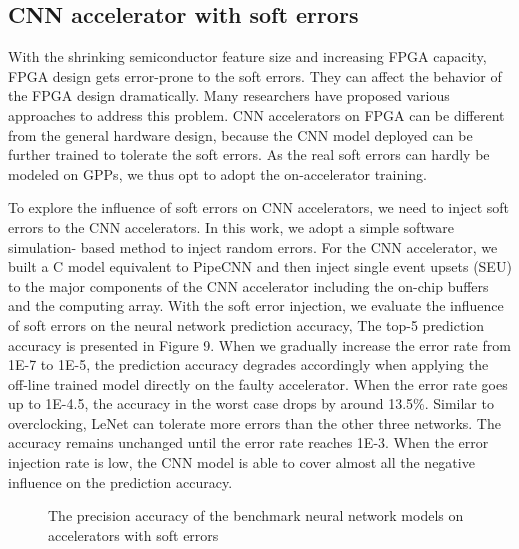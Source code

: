 \subsection{CNN accelerator with soft errors}
With the shrinking semiconductor feature size and increasing FPGA capacity, 
FPGA design gets error-prone to the soft errors. 
They can affect the behavior of the FPGA design dramatically. 
Many researchers \cite{Mansour_20,Karim_21,Nidhin_22,Subasi_23,ROSCH_24} 
have proposed various approaches to address this problem. CNN accelerators 
on FPGA can be different from the general hardware design, because 
the CNN model deployed can be further trained to tolerate the 
soft errors. As the real soft errors can hardly be modeled on GPPs, we thus
opt to adopt the on-accelerator training.

To explore the influence of soft errors on CNN accelerators, we need to inject soft errors to the CNN accelerators. 
In this work, we adopt a simple software simulation- based method to inject random errors. 
For the CNN accelerator, we built a C model equivalent to PipeCNN and then inject single event 
upsets (SEU) to the major components of the CNN accelerator including the on-chip buffers 
and the computing array. With the soft error injection, we evaluate the influence of 
soft errors on the neural network prediction accuracy, The top-5 prediction accuracy 
is presented in Figure 9. When we gradually increase the error rate from 1E-7 to 1E-5, 
the prediction accuracy degrades accordingly when applying the off-line 
trained model directly on the faulty accelerator. 
When the error rate goes up to 1E-4.5, the accuracy in the worst case drops 
by around 13.5\%. Similar to overclocking, LeNet can tolerate 
more errors than the other three networks. The accuracy remains unchanged 
until the error rate reaches 1E-3. When the error injection rate is low, 
the CNN model is able to cover almost all the negative influence 
on the prediction accuracy.

\begin{figure}
        \center
        \qquad
        \qquad
        \qquad
        \caption{The precision accuracy of the benchmark neural network models on accelerators with soft errors}
        \label{fig:softerror accuracy}
\end{figure}

